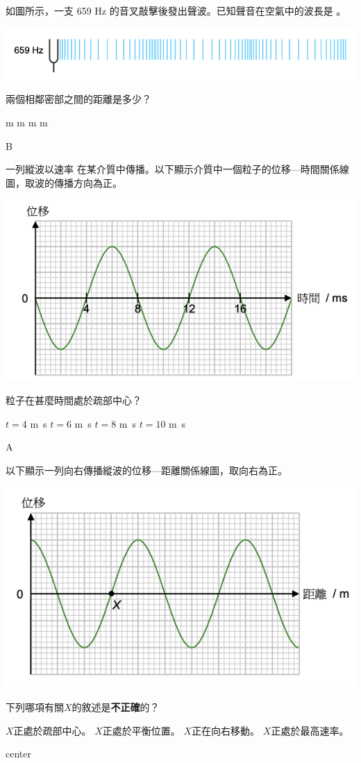 {
    如圖所示，一支 659 Hz 的音叉敲擊後發出聲波。已知聲音在空氣中的波長是 。
    \par{\par\centering\includegraphics[width=.6\textwidth]{./img/ch1_earlyclass_wave_mc_2024-05-13-16-20-01.png}\par}
    兩個相鄰密部之間的距離是多少？
    \begin{tasks}
         m
         m
         m
         m
    \end{tasks}

}{B}

{
    一列縱波以速率 在某介質中傳播。以下顯示介質中一個粒子的位移—時間關係線圖，取波的傳播方向為正。
    \par{\par\centering\includegraphics[width=.5\textwidth]{./img/ch1_earlyclass_wave_mc_2024-05-13-16-21-19.png}\par}
    粒子在甚麼時間處於疏部中心？
    \begin{tasks}
        \task $t=4$ \unit{m.s}
        \task $t=6$ \unit{m.s}
        \task $t=8$ \unit{m.s}
        \task $t=10$ \unit{m.s}
    \end{tasks}


}{A}

{
    以下顯示一列向右傳播縱波的位移—距離關係線圖，取向右為正。
    \par{\par\centering\includegraphics[width=.5\textwidth]{./img/ch1_earlyclass_wave_mc_2024-05-13-16-22-56.png}\par}
    下列哪項有關$X$的敘述是\textbf{不正確}的？
    \begin{tasks}
        \task $X$正處於疏部中心。
        \task $X$正處於平衡位置。
        \task $X$正在向右移動。
        \task $X$正處於最高速率。
    \end{tasks}

}{center}